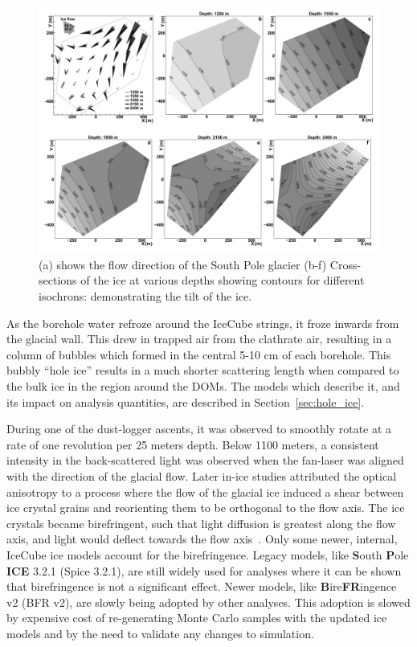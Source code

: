 \documentclass[main.tex]{subfiles}
\begin{document}
\begin{figure}  
    \centering
    \includegraphics[width=0.8\linewidth]{figures/icecube_isochron.png}
    \caption{(a) shows the flow direction of the South Pole glacier (b-f) Cross-sections of the ice at various depths showing contours for different isochrons: demonstrating the tilt of the ice.}\label{fig:isochron}
\end{figure}

As the borehole water refroze around the IceCube strings, it froze inwards from the glacial wall. 
This drew in trapped air from the clathrate air, resulting in a column of bubbles which formed in the central 5-10 cm of each borehole.
This bubbly ``hole ice'' results in a much shorter scattering length when compared to the bulk ice in the region around the DOMs. 
The models which describe it, and its impact on analysis quantities, are described in Section~\ref{sec:hole_ice}. 

During one of the dust-logger ascents, it was observed to smoothly rotate at a rate of one revolution per 25 meters depth. 
Below 1100 meters, a consistent intensity in the back-scattered light was observed when the fan-laser was aligned with the direction of the glacial flow. 
Later in-ice studies attributed the optical anisotropy to a process where the flow of the glacial ice induced a shear between ice crystal grains and reorienting them to be orthogonal to the flow axis. 
The ice crystals became birefringent, such that light diffusion is greatest along the flow axis, and light would deflect towards the flow axis~\cite{ice_anisotropy, ice_birefringence}.
Only some newer, internal, IceCube ice models account for the birefringence. 
Legacy models, like \textbf{S}outh \textbf{P}ole \textbf{ICE} 3.2.1 (Spice 3.2.1), are still widely used for analyses where it can be shown that birefringence is not a significant effect. 
Newer models, like \textbf{B}ire\textbf{FR}ingence v2 (BFR v2), are slowly being adopted by other analyses. 
This adoption is slowed by expensive cost of re-generating Monte Carlo samples with the updated ice models and by the need to validate any changes to simulation. 
\end{document}
